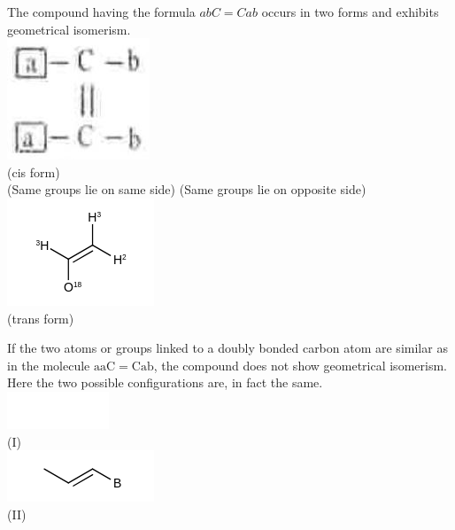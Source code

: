 \documentclass[10pt]{article}
\begin{document}
The compound having the formula $a b C=C a b$ occurs in two forms and exhibits geometrical isomerism.\\
\includegraphics[max width=\textwidth, center]{2025_01_28_8470952b98110cec3aabg-045}\\
(cis form)\\
(Same groups lie on same side) (Same groups lie on opposite side)\\
\includegraphics{smile-acc1d4e37e6354bb3cb5b906ad9e0524410ee1a5}\\
(trans form)

If the two atoms or groups linked to a doubly bonded carbon atom are similar as in the molecule $\mathrm{aaC}=\mathrm{Cab}$, the compound does not show geometrical isomerism. Here the two possible configurations are, in fact the same.\\
\includegraphics{smile-1fabc5f25bd5c7050fd1bac91c3ee210173befa0}\\
(I)\\
\includegraphics{smile-b21543032adb3b50d59c2accebe8ab5feb7ee90b}\\
(II)
\end{document}
